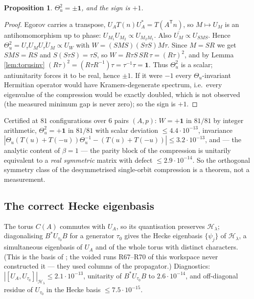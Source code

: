 \documentclass[11pt,reqno]{amsart}
\newtheorem{proposition}[theorem]{Proposition}
\theoremstyle{definition}
\newcommand{\HH}{\mathcal{H}}
\begin{document}
\begin{proposition}\label{prop:Esquare}
$\Theta_u^2=\pm\mathbf1$, and the sign is $+1$.
\end{proposition}
\begin{proof}
Egorov carries a transpose, $U_AT(n)U_A^*=T(A^{\mathsf T}n)$, so
$M\mapsto U_M$ is an antihomomorphism up to phase:
$U_{M_1}U_{M_2}\propto U_{M_2M_1}$. Also
$\overline{U_{M}}\propto U_{SMS}$. Hence
$\Theta_u^2=U_\tau U_M\overline{U_\tau U_M}\propto U_{W}$ with
$W=(SMS)(S\tau S)M\tau$. Since $M=SR$ we get $SMS=RS$ and $S(S\tau S)=\tau S$,
so $W=R\tau S\,SR\,\tau=(R\tau)^2$, and by Lemma \ref{lem:torusinv}
$(R\tau)^2=(R\tau R^{-1})\tau=\tau^{-1}\tau=\mathbf1$. Thus $\Theta_u^2$ is a
scalar; antiunitarity forces it to be real, hence $\pm1$. If it were $-1$ every
$\Theta_u$-invariant Hermitian operator would have Kramers-degenerate spectrum,
i.e.\ every eigenvalue of the compression would be exactly doubled, which is not
observed (the measured minimum gap is never zero); so the sign is $+1$.
\end{proof}

Certified at $81$ configurations over $6$ pairs $(A,p)$: $W=+\mathbf1$ in
$81/81$ by integer arithmetic, $\Theta_u^2=+\mathbf1$ in $81/81$ with scalar
deviation $\le4.4\cdot10^{-13}$, invariance
$|\Theta_u(T(u)+T(-u))\Theta_u^{-1}-(T(u)+T(-u))|\le3.2\cdot10^{-13}$, and --- the
analytic content of $\beta=1$ --- the parity block of the compression is
unitarily equivalent to a \emph{real symmetric} matrix with defect
$\le2.9\cdot10^{-14}$. So the orthogonal symmetry class of the desymmetrised
single-orbit compression is a theorem, not a measurement.

\subsection{The correct Hecke eigenbasis}

The torus $C(A)$ commutes with $U_A$, so its quantisation preserves
$\HH_\lambda$; diagonalising $B^*U_{\tau_0}B$ for a generator $\tau_0$ gives the
Hecke eigenbasis $\{\psi_j\}$ of $\HH_\lambda$, a simultaneous eigenbasis of
$U_A$ and of the whole torus with distinct characters. (This is the basis of
\cite{KurlbergRudnick2005}; the voided runs R67--R70 of this workspace never
constructed it --- they used columns of the propagator.) Diagnostics:
$|[U_A,U_{\tau_0}]|_{\HH_\lambda}\le2.1\cdot10^{-13}$, unitarity of
$B^*U_{\tau_0}B$ to $2.6\cdot10^{-14}$, and off-diagonal residue of $U_{\tau_0}$
in the Hecke basis $\le7.5\cdot10^{-15}$.
\end{document}
